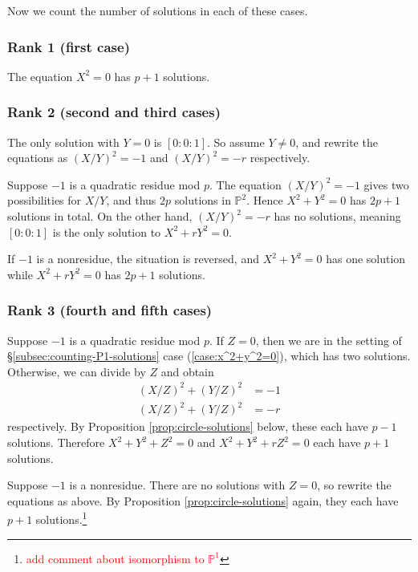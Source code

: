 \documentclass[10pt,a4paper]{amsart}
\numberwithin{equation}{section}
\numberwithin{figure}{section}
\theoremstyle{definition}
\theoremstyle{remark}
\theoremstyle{plain}
\theoremstyle{plain}
\theoremstyle{definition}
\theoremstyle{plain}
\theoremstyle{plain}
\renewcommand{\P}{\mathbb{P}}
\begin{document}
Now we count the number of solutions in each of these cases.
\subsubsection*{Rank 1 (first case)}
The equation $X^2 = 0$ has $p + 1$ solutions.

\subsubsection*{Rank 2 (second and third cases)}
The only solution with $Y=0$ is $[0:0:1]$. So assume $Y \neq 0$, and rewrite the equations as $(X/Y)^2 = -1$ and $(X/Y)^2 = -r$ respectively.

Suppose $-1$ is a quadratic residue mod $p$. The equation $(X/Y)^2 = -1$ gives two possibilities for $X/Y$, and thus $2p$ solutions in $\mathbb{P}^2$. Hence $X^2 + Y^2 = 0$ has $2p + 1$ solutions in total. On the other hand, $(X/Y)^2 = -r$ has no solutions, meaning $[0:0:1]$ is the only solution to $X^2 + rY^2 = 0$.

If $-1$ is a nonresidue, the situation is reversed, and $X^2 + Y^2 = 0$ has one solution while $X^2 + rY^2 = 0$ has $2p + 1$ solutions.

\subsubsection*{Rank 3 (fourth and fifth cases)}
Suppose $-1$ is a quadratic residue mod $p$. If $Z = 0$, then we are in the setting of \S\ref{subsec:counting-P1-solutions} case (\ref{case:x^2+y^2=0}), which has two solutions. Otherwise, we can divide by $Z$ and obtain
\begin{align*}
(X/Z)^2 + (Y/Z)^2 &= -1\\
(X/Z)^2 + (Y/Z)^2 &= -r
\end{align*}
respectively. By Proposition \ref{prop:circle-solutions} below, these each have $p - 1$ solutions. Therefore $X^2 + Y^2 + Z^2 = 0$ and $X^2 + Y^2 + rZ^2 = 0$ each have $p+1$ solutions.

Suppose $-1$ is a nonresidue. There are no solutions with $Z=0$, so rewrite the equations as above. By Proposition \ref{prop:circle-solutions} again, they each have $p + 1$ solutions.\footnote{\textcolor{red}{add comment about isomorphism to $\P^1$}}
\end{document}
